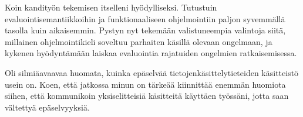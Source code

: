 Koin kandityön tekemisen itselleni hyödylliseksi. Tutustuin evaluointisemantiikkoihin ja funktionaaliseen ohjelmointiin paljon syvemmällä tasolla kuin aikaisemmin. Pystyn nyt tekemään valistuneempia valintoja siitä, millainen ohjelmointikieli soveltuu parhaiten käsillä olevaan ongelmaan, ja kykenen hyödyntämään laiskaa evaluointia rajatuiden ongelmien ratkaisemisessa.

Oli silmiäavaavaa huomata, kuinka epäselvää tietojenkäsittelytieteiden käsitteistö usein on. Koen, että jatkossa minun on tärkeää kiinnittää enemmän huomiota siihen, että kommunikoin yksiselitteisiä käsitteitä käyttäen työssäni, jotta saan vältettyä epäselvyyksiä.

%
